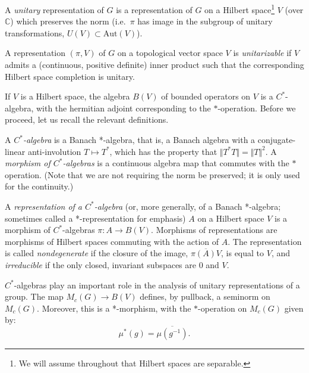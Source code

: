 \begin{definition}
\label{definition-unitary-representation}
A {\it unitary} representation of $G$ is a representation of $G$ on a Hilbert space\footnote{We will assume throughout that Hilbert spaces are separable.} $V$ (over $\mathbb C$) which preserves the norm (i.e.\ $\pi$ has image in the subgroup of unitary transformations, $U(V)\subset \text{Aut}(V)$). 

A representation $(\pi,V)$ of $G$ on a topological vector space $V$ is {\it unitarizable} if $V$ admits a (continuous, positive definite) inner product such that the corresponding Hilbert space completion is unitary.
\end{definition}

If $V$ is a Hilbert space, the algebra $B(V)$ of bounded operators on $V$ is a $C^*$-algebra, with the hermitian adjoint corresponding to the $*$-operation. Before we proceed, let us recall the relevant definitions.

\begin{definition}
 \label{definition-Cstar-algebra}
A {\it $C^*$-algebra} is a Banach *-algebra, that is, a Banach algebra with a conjugate-linear anti-involution $T\mapsto T^*$, which has the property that $\Vert T^*T\Vert = \Vert T\Vert^2$. A {\it morphism of $C^*$-algebras} is a continuous algebra map that commutes with the $*$ operation.
(Note that we are not requiring the norm be preserved; it is only used for the continuity.)

A \textit{representation of a $C^*$-algebra} (or, more generally, of a Banach *-algebra; sometimes called a *-representation for emphasis) $A$ on a Hilbert space $V$ is a morphism of $C^*$-algebras $\pi:A\to B(V)$. Morphisms of representations are morphisms of Hilbert spaces commuting with the action of $A$. The representation is called {\it nondegenerate} if the closure of the image, $\overline{\pi(A)V}$, is equal to $V$, and {\it irreducible} if the only closed, invariant subspaces are $0$ and $V$.
\end{definition}


$C^*$-algebras play an important role in the analysis of unitary representations of a group. 
The map $M_c(G)\to B(V)$ defines, by pullback, a seminorm on $M_c(G)$. Moreover, this is a *-morphism, with the $*$-operation on $M_c(G)$ given by:
\begin{equation}
 \label{equation-star-on-measures}
\mu^*(g) = \overline{\mu(g^{-1})}.
\end{equation}


